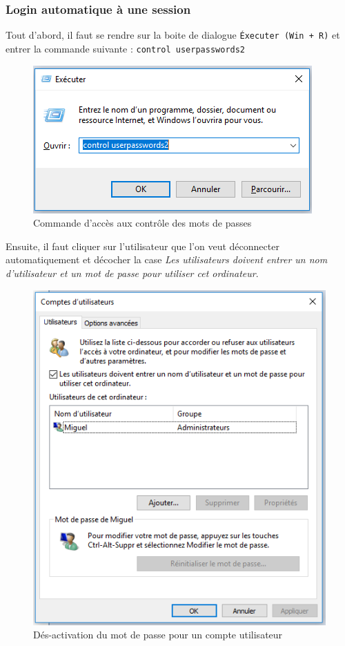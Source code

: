 \documentclass[12pt]{article}
\begin{document}
\clearpage

\subsubsection{Login automatique à une session}
Tout d'abord, il faut se rendre sur la boite de dialogue \texttt{Éxecuter (Win + R)} et entrer la commande suivante : \texttt{control userpasswords2}

\begin{figure}[htp]
    \centering
    \includegraphics[scale=.75]{control_passwords.png}
    \caption{Commande d'accès aux contrôle des mots de passes}
    \label{fig:control_passwords}
\end{figure}

Ensuite, il faut cliquer sur l'utilisateur que l'on veut déconnecter automatiquement et décocher la case \textit{Les utilisateurs doivent entrer un nom d'utilisateur et un mot de passe pour utiliser cet ordinateur}.

\begin{figure}[h]
    \centering
    \includegraphics[scale=.6]{users.png}
    \caption{Dés-activation du mot de passe pour un compte utilisateur}
    \label{fig:users}
\end{figure}
\end{document}
